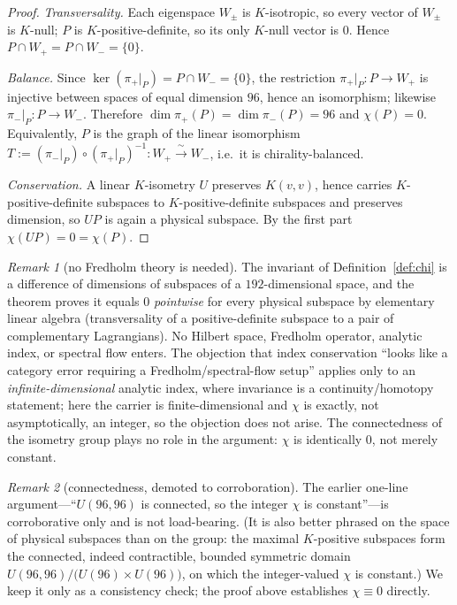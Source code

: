 \documentclass[11pt]{article}
\theoremstyle{definition}
\theoremstyle{remark}
\newtheorem*{remark}{Remark}
\begin{document}
\begin{proof}
\emph{Transversality.} Each eigenspace $W_\pm$ is $K$-isotropic, so every vector of $W_\pm$ is $K$-null;
$P$ is $K$-positive-definite, so its only $K$-null vector is $0$. Hence $P\cap W_+=P\cap W_-=\{0\}$.

\emph{Balance.} Since $\ker(\pi_+|_P)=P\cap W_-=\{0\}$, the restriction $\pi_+|_P\colon P\to W_+$ is injective
between spaces of equal dimension $96$, hence an isomorphism; likewise $\pi_-|_P\colon P\to W_-$. Therefore
$\dim\pi_+(P)=\dim\pi_-(P)=96$ and $\chi(P)=0$. Equivalently, $P$ is the graph of the linear isomorphism
$T:=(\pi_-|_P)\circ(\pi_+|_P)^{-1}\colon W_+\xrightarrow{\ \sim\ }W_-$, i.e.\ it is chirality-balanced.

\emph{Conservation.} A linear $K$-isometry $U$ preserves $K(v,v)$, hence carries $K$-positive-definite subspaces
to $K$-positive-definite subspaces and preserves dimension, so $UP$ is again a physical subspace. By the first
part $\chi(UP)=0=\chi(P)$.
\end{proof}

\begin{remark}[no Fredholm theory is needed]
The invariant of Definition~\ref{def:chi} is a difference of dimensions of subspaces of a $192$-dimensional
space, and the theorem proves it equals $0$ \emph{pointwise} for every physical subspace by elementary linear
algebra (transversality of a positive-definite subspace to a pair of complementary Lagrangians). No Hilbert
space, Fredholm operator, analytic index, or spectral flow enters. The objection that index conservation ``looks
like a category error requiring a Fredholm/spectral-flow setup'' applies only to an \emph{infinite-dimensional}
analytic index, where invariance is a continuity/homotopy statement; here the carrier is finite-dimensional and
$\chi$ is exactly, not asymptotically, an integer, so the objection does not arise. The connectedness of the
isometry group plays no role in the argument: $\chi$ is identically $0$, not merely constant.
\end{remark}

\begin{remark}[connectedness, demoted to corroboration]
The earlier one-line argument---``$U(96,96)$ is connected, so the integer $\chi$ is constant''---is corroborative
only and is not load-bearing. (It is also better phrased on the space of physical subspaces than on the group:
the maximal $K$-positive subspaces form the connected, indeed contractible, bounded symmetric domain
$U(96,96)/\!\bigl(U(96)\times U(96)\bigr)$, on which the integer-valued $\chi$ is constant.) We keep it only as a
consistency check; the proof above establishes $\chi\equiv0$ directly.
\end{remark}
\end{document}
